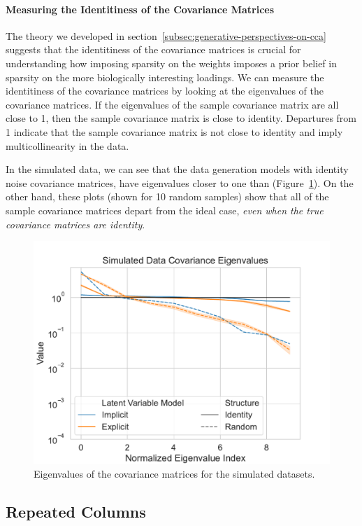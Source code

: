 \paragraph{Measuring the Identitiness of the Covariance Matrices}
The theory we developed in section~\ref{subsec:generative-perspectives-on-cca} suggests that the identitiness of the covariance matrices is crucial for understanding how imposing sparsity on the weights imposes a prior belief in sparsity on the more biologically interesting loadings.
We can measure the identitiness of the covariance matrices by looking at the eigenvalues of the covariance matrices.
If the eigenvalues of the sample covariance matrix are all close to 1, then the sample covariance matrix is close to identity.
Departures from 1 indicate that the sample covariance matrix is not close to identity and imply multicollinearity in the data.

In the simulated data, we can see that the data generation models with identity noise covariance matrices, have eigenvalues closer to one than (Figure~\ref{fig:covariance-eigenvalues-simulated-low}).
On the other hand, these plots (shown for 10 random samples) show that all of the sample covariance matrices depart from the ideal case, \textit{even when the true covariance matrices are identity}.

\begin{figure}
\centering
\includegraphics[width=0.8\linewidth]{figures/covariance/simulated_covariance_eigenvalues_low}
\caption{Eigenvalues of the covariance matrices for the simulated datasets.}\label{fig:covariance-eigenvalues-simulated-low}
\end{figure}


\subsection{Repeated Columns}\label{subsec:repeated-columns}

